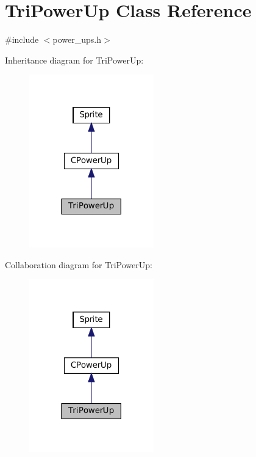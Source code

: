 \hypertarget{classTriPowerUp}{}\section{Tri\+Power\+Up Class Reference}
\label{classTriPowerUp}


{\ttfamily \#include $<$power\+\_\+ups.\+h$>$}



Inheritance diagram for Tri\+Power\+Up\+:
\nopagebreak
\begin{figure}[H]
\begin{center}
\leavevmode
\includegraphics[width=153pt]{classTriPowerUp__inherit__graph}
\end{center}
\end{figure}


Collaboration diagram for Tri\+Power\+Up\+:
\nopagebreak
\begin{figure}[H]
\begin{center}
\leavevmode
\includegraphics[width=153pt]{classTriPowerUp__coll__graph}
\end{center}
\end{figure}
